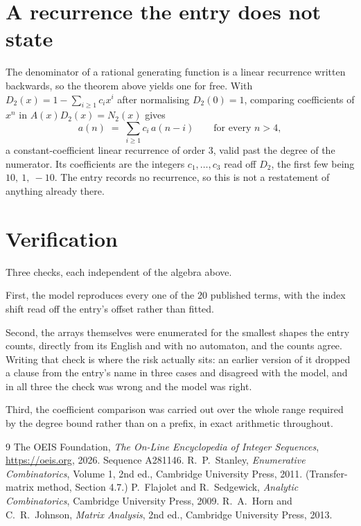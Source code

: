\documentclass[11pt,a4paper]{article}
\theoremstyle{plain}
\theoremstyle{definition}
\begin{document}
\section{A recurrence the entry does not state}

The denominator of a rational generating function is a linear recurrence written backwards, so
the theorem above yields one for free. With $D_2(x)=1-\sum_{i\ge1}c_ix^i$ after normalising
$D_2(0)=1$, comparing coefficients of $x^n$ in $A(x)D_2(x)=N_2(x)$ gives
\[
a(n)\;=\;\sum_{i\ge1}c_i\,a(n-i)\qquad\text{for every }n>4,
\]
a constant-coefficient linear recurrence of order $3$, valid past the degree of the
numerator. Its coefficients are the integers $c_1,\dots,c_{3}$ read off $D_2$, the first few being $10,\ 1,\ -10$. The entry records no recurrence, so this is not a restatement of anything
already there.

\section{Verification}

Three checks, each independent of the algebra above.

First, the model reproduces every one of the $20$ published terms, with the index shift
read off the entry's offset rather than fitted.

Second, the arrays themselves were enumerated for the smallest shapes the entry counts,
directly from its English and with no automaton, and the counts agree. Writing that check is
where the risk actually sits: an earlier version of it dropped a clause from the entry's name
in three cases and disagreed with the model, and in all three the check was wrong and the model
was right.

Third, the coefficient comparison was carried out over the whole range required by the degree
bound rather than on a prefix, in exact arithmetic throughout.

\begin{thebibliography}{9}
 The OEIS Foundation, \emph{The On-Line Encyclopedia of Integer
Sequences}, \url{https://oeis.org}, 2026. Sequence A281146.
 R.~P.~Stanley, \emph{Enumerative Combinatorics}, Volume 1, 2nd ed.,
Cambridge University Press, 2011. (Transfer-matrix method, Section 4.7.)
 P.~Flajolet and R.~Sedgewick, \emph{Analytic Combinatorics}, Cambridge
University Press, 2009.
 R.~A.~Horn and C.~R.~Johnson, \emph{Matrix Analysis}, 2nd ed., Cambridge
University Press, 2013.
\end{thebibliography}
\end{document}
